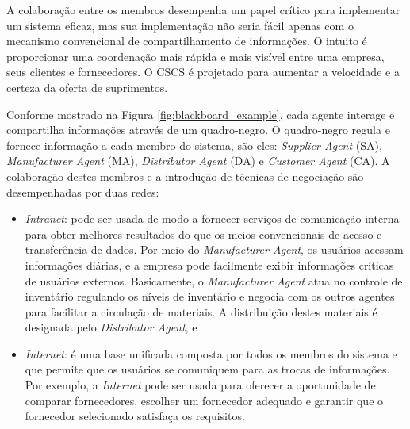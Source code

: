 \begin{description}
A colaboração entre os membros desempenha um papel crítico para implementar um sistema eficaz, mas sua implementação não seria fácil apenas com o mecanismo convencional de compartilhamento de informações. O intuito é proporcionar uma coordenação mais rápida e mais visível entre uma empresa, seus clientes e fornecedores. O CSCS é projetado para aumentar a velocidade e a certeza da oferta de suprimentos.


Conforme mostrado na Figura \ref{fig:blackboard_example}, cada agente interage e compartilha informações através de um quadro-negro. O quadro-negro regula e fornece informação a cada membro do sistema, são eles: \textit{Supplier Agent} (SA), \textit{Manufacturer Agent} (MA), \textit{Distributor Agent} (DA) e \textit{Customer Agent} (CA). A colaboração destes membros e a introdução de técnicas de negociação são desempenhadas por duas redes:

\begin{itemize}
    \item \textit{Intranet}: pode ser usada de modo a fornecer serviços de comunicação interna para obter melhores resultados do que os meios convencionais de acesso e transferência de dados. Por meio do \textit{Manufacturer Agent}, os usuários acessam informações diárias, e a empresa pode facilmente exibir informações críticas de usuários externos.  Basicamente, o \textit{Manufacturer Agent}  atua no controle de inventário regulando os níveis de inventário e negocia com os outros agentes para facilitar a circulação de materiais. A distribuição destes materiais é designada pelo \textit{Distributor Agent}, e 
    \item \textit{Internet}: é uma base unificada composta por todos os membros do sistema e que permite que os usuários se comuniquem para as trocas de informações. Por exemplo, a \textit{Internet} pode ser usada para oferecer a oportunidade de comparar  fornecedores, escolher um fornecedor adequado e garantir que o fornecedor selecionado satisfaça os requisitos.
\end{itemize}


\end{description}
